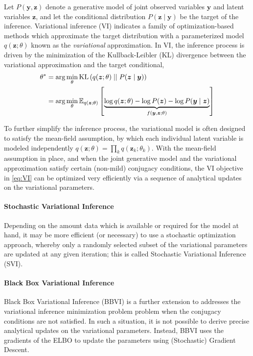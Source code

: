 \documentclass[11pt]{article}
\begin{document}
Let $P(\bm y, \bm z)$ denote a generative model of joint observed variables
$\bm y$ and latent variables $\bm z$, and let the conditional distribution
$P(\bm z\mid \bm y)$ be the target of the inference.  Variational inference
(VI) indicates a family of optimization-based methods which approximate the
target distribution with a parameterized model $q(\bm z; \theta)$ known as the
\emph{variational} approximation. In VI, the inference process is driven by
the minimization of the Kullback-Leibler (KL) divergence between the
variational approximation and the target conditional,
%
\begin{align}
  \theta^* &= \arg\min_\theta {\operatorname{KL}}\left( q(\bm z; \theta) \mid\mid P(\bm z\mid
  \bm y) \right) \\
  &= \arg\min_\theta {\mathbb{E}}_{q(\bm z; \theta)}\left[ \underbrace{ \log q(\bm z; \theta) - \log
  P(\bm z) -\log P(\bm y\mid \bm z) }_{f(\bm y, \bm z; \theta)} \right] \label{eq:VI}
\end{align}


To further simplify the inference process, the variational model is often
designed to satisfy the mean-field assumption, by which each individual latent
variable is modeled independently $q(\bm z; \theta) = \prod_k q(\bm z_k;
\theta_k)$.  With the mean-field assumption in place, and when the joint
generative model and the variational approximation satisfy certain (non-mild)
conjugacy conditions, the VI objective in \cref{eq:VI} can be optimized very
efficiently via a sequence of analytical updates on the variational parameters.
\paragraph{Stochastic Variational Inference}  Depending on the amount data
which is available or required for the model at hand, it may be more efficient
(or necessary) to use a stochastic optimization approach, whereby only
a randomly selected subset of the variational parameters are updated at any
given iteration; this is called Stochastic Variational Inference (SVI).

\paragraph{Black Box Variational Inference}  Black Box Variational Inference
(BBVI) is a further extension to addresses the variational inference
minimization problem problem when the conjugacy conditions are not satisfied.
In such a situation, it is not possible to derive precise analytical updates on
the variational parameters.  Instead, BBVI uses the gradients of the ELBO to
update the parameters using (Stochastic) Gradient Descent.
\end{document}

